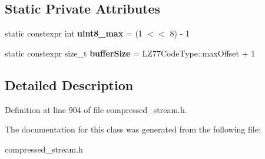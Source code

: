 \subsection*{Static Private Attributes}
\begin{DoxyCompactItemize}
\item 
\hypertarget{classCompressWriter_ace86be05e5886cfd42f77a5091c06b7a}{static constexpr int {\bfseries uint8\+\_\+max} = (1 $<$$<$ 8) -\/ 1}\label{classCompressWriter_ace86be05e5886cfd42f77a5091c06b7a}

\item 
\hypertarget{classCompressWriter_a96d2b6c2db5e69b996be1fefa7f337cb}{static constexpr size\+\_\+t {\bfseries buffer\+Size} = L\+Z77\+Code\+Type\+::max\+Offset + 1}\label{classCompressWriter_a96d2b6c2db5e69b996be1fefa7f337cb}

\end{DoxyCompactItemize}


\subsection{Detailed Description}


Definition at line 904 of file compressed\+\_\+stream.\+h.



The documentation for this class was generated from the following file\+:\begin{DoxyCompactItemize}
\item 
compressed\+\_\+stream.\+h\end{DoxyCompactItemize}

